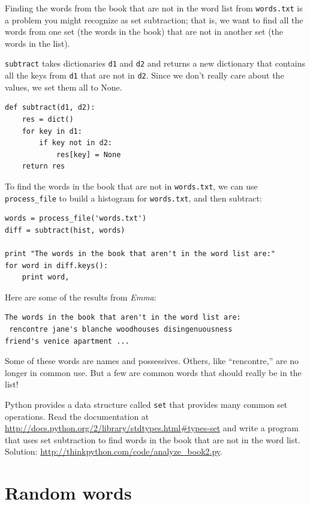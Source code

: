 \documentclass[10pt]{book}
\begin{document}
Finding the words from the book that are not in the word list
from {\tt words.txt} is a problem you might recognize as set
subtraction; that is, we want to find all the words from one
set (the words in the book) that are not in another set (the
words in the list).

{\tt subtract} takes dictionaries {\tt d1} and {\tt d2} and returns a
new dictionary that contains all the keys from {\tt d1} that are not
in {\tt d2}.  Since we don't really care about the values, we
set them all to None.

\begin{verbatim}
def subtract(d1, d2):
    res = dict()
    for key in d1:
        if key not in d2:
            res[key] = None
    return res
\end{verbatim}
%
To find the words in the book that are not in {\tt words.txt},
we can use \verb"process_file" to build a histogram for
{\tt words.txt}, and then subtract:

\begin{verbatim}
words = process_file('words.txt')
diff = subtract(hist, words)

print "The words in the book that aren't in the word list are:"
for word in diff.keys():
    print word,
\end{verbatim}
%
Here are some of the results from {\em Emma}:

\begin{verbatim}
The words in the book that aren't in the word list are:
 rencontre jane's blanche woodhouses disingenuousness 
friend's venice apartment ...
\end{verbatim}
%
Some of these words are names and possessives.  Others, like
``rencontre,'' are no longer in common use.  But a few are common
words that should really be in the list!

\begin{exercise}

Python provides a data structure called {\tt set} that provides many
common set operations.  Read the documentation at
\url{http://docs.python.org/2/library/stdtypes.html#types-set} and
write a program that uses set subtraction to find words in the book
that are not in the word list.  Solution:
\url{http://thinkpython.com/code/analyze_book2.py}.

\end{exercise}


\section{Random words}
\label{randomwords}
\end{document}
